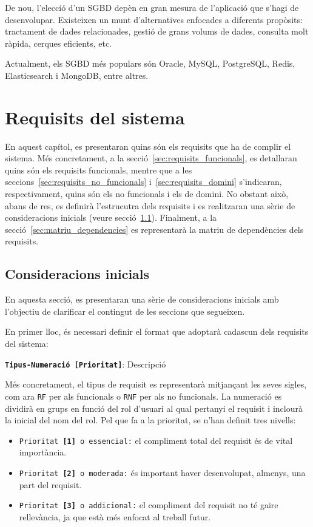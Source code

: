 \documentclass[a4paper,12pt]{ThesisStyle}
\begin{document}
De nou, l'elecció d'un SGBD depèn en gran mesura de l'aplicació que s'hagi de desenvolupar. Existeixen un munt d'alternatives enfocades a diferents propòsits: tractament de dades relacionades, gestió de grans volums de dades, consulta molt ràpida, cerques eficients, etc.

Actualment, els SGBD més populars són Oracle, MySQL, PostgreSQL, Redis, Elasticsearch i MongoDB, entre altres.


\chapter{Requisits del sistema}
\label{cap:requisits}

En aquest capítol, es presentaran quins són els requisits que ha de complir el sistema. Més concretament, a la secció~\ref{sec:requisits_funcionals}, es detallaran quins són els requisits funcionals, mentre que a les seccions~\ref{sec:requisits_no_funcionals} i~\ref{sec:requisits_domini} s'indicaran, respectivament, quins són els no funcionals i els de domini. No obstant això, abans de res, es definirà l'estrucutra dels requisits i es realitzaran una sèrie de consideracions inicials (veure secció~\ref{sec:consideracions_inicials}). Finalment, a la secció~\ref{sec:matriu_dependencies} es representarà la matriu de dependències dels requisits.

\section{Consideracions inicials}
\label{sec:consideracions_inicials}

En aquesta secció, es presentaran una sèrie de consideracions inicials amb l'objectiu de clarificar el contingut de les seccions que segueixen.

En primer lloc, és necessari definir el format que adoptarà cadascun dels requisits del sistema:
\\[8pt]
\centerline{\texttt{\textbf{Tipus-Numeració [Prioritat]}}: Descripció}

Més concretament, el tipus de requisit es representarà mitjançant les seves sigles, com ara \texttt{RF} per als funcionals o \texttt{RNF} per als no funcionals. La numeració es dividirà en grups en funció del rol d'usuari al qual pertanyi el requisit i inclourà la inicial del nom del rol. Pel que fa a la prioritat, se n'han definit tres nivells:
\begin{itemize}
  \item \texttt{Prioritat \textbf{[1]} o essencial:} el compliment total del requisit és de vital importància.
  \item \texttt{Prioritat \textbf{[2]} o moderada:} és important haver desenvolupat, almenys, una part del requisit.
  \item \texttt{Prioritat \textbf{[3]} o addicional:} el compliment del requisit no té gaire rellevància, ja que està més enfocat al treball futur.
\end{itemize}
\end{document}
